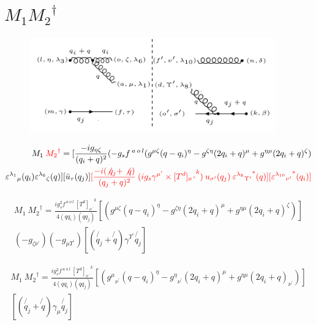 \section{$M_1 {M_2}^{\dagger}$}
\begin{figure}[ht!]
\centering
\includegraphics[width=0.95\textwidth]{images/ggqM1M2dagger.png}
\end{figure}
\begin{equation}
\begin{split}
M_1\:{\color[RGB]{255,0,0} {M_2}^{\dagger}}=[\frac{-ig_{{\eta}{\zeta}}}{(q_i +q)^2}(-g_s f^{\:a\:o\:l}(g^{{\mu}{\zeta}}(q-q_i)^{\eta}-g^{{\zeta}{\eta}}(2q_i +q)^{\mu}+g^{{\eta}{\mu}}(2q_i +q)^{\zeta})\\
{\varepsilon^{\lambda_1}}_{\mu} (q_i) {\varepsilon^{\lambda_6}}_{\zeta} (q)][\bar{u}_{\tau}(q_j)]
{\color[RGB]{255,0,0}[\frac{-i(\not{q_j} + \not{q})}{(q_j + q)^2} \:  (ig_s \gamma^{{\mu}^{\prime}}\times {[T^d]_{o\:^{\prime}}}^k) \: u_{{\sigma}^{\prime}}(q_j) \: {{\varepsilon^{\lambda_8}}_{{\Upsilon}^{\prime}}}^* (q)][{{\varepsilon^{\lambda_{10}}}_{{\nu}^{\prime}}}^* (q_i)]}
\end{split}
\end{equation}


\begin{equation}
\begin{split}
M_1\:{M_2}^{\dagger}=\frac{ig_s ^2 f^{\:a\:o\:l}\: {[T^d]_{o\:^{\prime}}}^k}{4(qq_i)(qq_j)}
[(g^{{\mu}{\zeta}}(q-q_i)^{\eta}-g^{{\zeta}{\eta}}(2q_i +q)^{\mu}+g^{{\eta}{\mu}}(2q_i +q)^{\zeta})]\\
(-g_{{{\zeta}}{{\nu}^{\prime}}})(-g_{{\mu}{{\Upsilon}^{\prime}}})[(\not{q_j} + \not{q})\gamma^{{\Upsilon}^{\prime}}\not{q_j}]
\end{split}
\end{equation}

\begin{equation}
\begin{split}
M_1\:{M_2}^{\dagger}=\frac{ig_s ^2 f^{\:a\:o\:l}\: {[T^d]_{o\:^{\prime}}}^k}{4(qq_i)(qq_j)}
[({g^{{\mu}}}_{{\nu}^{\prime}}(q-q_i)^{\eta}-{g^{{\eta}}}_{{\nu}^{\prime}}(2q_i +q)^{\mu}+g^{{\eta}{\mu}}(2q_i +q)_{{\nu}^{\prime}})]\\
[(\not{q_j} + \not{q})\gamma_{{\mu}}\not{q_j}]
\end{split}
\end{equation}

